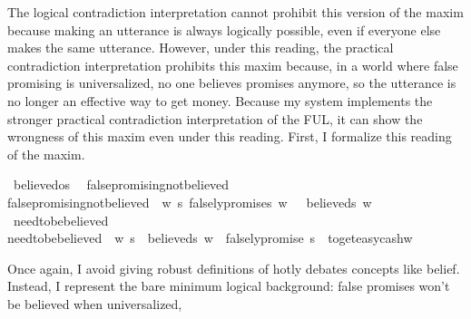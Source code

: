 \begin{isabellebody}
\begin{isamarkuptext}
The logical
contradiction interpretation cannot prohibit this version of the maxim because making an utterance
is always logically possible, even if everyone else makes the same utterance. However,
under this reading, the practical contradiction interpretation prohibits this maxim because, in a world 
where false promising is universalized, no one believes promises anymore, so the utterance is no longer 
an effective way to get money. Because my system implements the stronger practical contradiction 
interpretation of the FUL, it can show the wrongness of this maxim even under this reading. First, 
I formalize this reading of the maxim.%
\end{isamarkuptext}\isamarkuptrue%
\isamarkupfalse%
\ believed{\isacharcolon}{\isacharcolon}os\ \isanewline
{}\isamarkupfalse%
\ false{\isacharunderscore}promising{\isacharunderscore}not{\isacharunderscore}believed\ \ \isanewline
{\isachardoublequoteopen}false{\isacharunderscore}promising{\isacharunderscore}not{\isacharunderscore}believed\ {\isasymequiv}\ {\isasymforall}w\ s{\isachardot}\ {\isacharparenleft}falsely{\isacharunderscore}promise{\isacharparenleft}s{\isacharparenright}\ w\ {\isasymlongrightarrow}\ {\isasymnot}\ believed{\isacharparenleft}s{\isacharparenright}\ w{\isacharparenright}{\isachardoublequoteclose}\isanewline
%
\isanewline
\isanewline
{}\isamarkupfalse%
\ need{\isacharunderscore}to{\isacharunderscore}be{\isacharunderscore}believed\ \ \isanewline
{\isachardoublequoteopen}need{\isacharunderscore}to{\isacharunderscore}be{\isacharunderscore}believed\ {\isasymequiv}\ {\isasymforall}w\ s{\isachardot}\ {\isacharparenleft}{\isasymnot}\ believed{\isacharparenleft}s{\isacharparenright}\ w\ {\isasymlongrightarrow}\ \isactrlbold {\isasymnot}{\isacharparenleft}{\isacharparenleft}falsely{\isacharunderscore}promise\ s{\isacharparenright}\ \isactrlbold {\isasymrightarrow}\ to{\isacharunderscore}get{\isacharunderscore}easy{\isacharunderscore}cash{\isacharparenright}w{\isacharparenright}{\isachardoublequoteclose}\isanewline
%
%
\begin{isamarkuptext}%
Once again, I avoid giving robust definitions of hotly debates concepts like belief. Instead, 
I represent the bare minimum logical background: false promises won't be believed when universalized,

\end{isamarkuptext}
\end{isabellebody}
